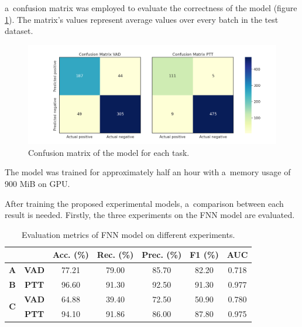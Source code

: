     a~confusion matrix was employed to evaluate the correctness of the model (figure \ref{fig:confusionmatrixcnn}). The matrix's values represent average values over every batch in the test dataset. 
 
    \begin{figure}[ht!]
        \centering
        \includegraphics[width = \textwidth]{obrazky-figures/CM_VAD_PTT.png}
        \caption{Confusion matrix of the model for each task.}
        \label{fig:confusionmatrixcnn}
    \end{figure}
    The model was trained for approximately  half an hour with a~memory usage of 900 MiB on GPU. 
    \newpage

    After training the proposed experimental models, a~comparison between each result is needed. Firstly, the three experiments on the FNN model are evaluated.

    \begin{table}[!h]  
    \begin{center}
    \begin{tabular}{|c|c|c|c|c|c|c|}\hline 
        \multicolumn{2}{|c|}{} & \textbf{Acc. (\%)}  & \textbf{Rec. (\%)} & \textbf{Prec. (\%)} & \textbf{F1 (\%)} & \textbf{AUC}\\ \hline
        \textbf{A} & \textbf{VAD} & 77.21 & 79.00 & 85.70 & 82.20 & 0.718\\ \hline
        \textbf{B} & \textbf{PTT} & 96.60 & 91.30 & 92.50 & 91.30 & 0.977\\ \hline
        \multirow{2}{*}{\textbf{C}} & \textbf{VAD} & 64.88 & 39.40 & 72.50 & 50.90 & 0.780\\ \cline{2-7}
        & \textbf{PTT} & 94.10 & 91.86 & 86.00 & 87.80 & 0.975\\ \hline
    \end{tabular}
    \caption{Evaluation metrics of FNN model on different experiments.}
    \label{evaluationFNN}
    \end{center}
    \end{table}


